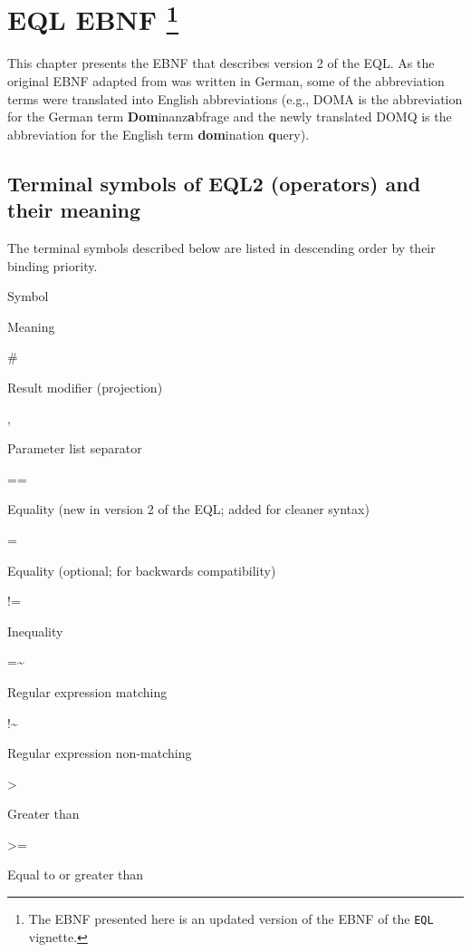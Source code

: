 \documentclass[]{book}
\let\rmarkdownfootnote\footnote%
\def\footnote{\protect\rmarkdownfootnote}
\begin{document}
\hypertarget{app-chap:EQL-EBNF}{%
\chapter[EQL EBNF ]{\texorpdfstring{EQL EBNF \footnote{The EBNF presented here is an updated version of the EBNF of the \texttt{EQL} vignette.}}{EQL EBNF }}\label{app-chap:EQL-EBNF}}

This chapter presents the EBNF \citep{garshol:2003a} that describes version 2 of the EQL. As the original EBNF adapted from \citet{john:2012a} was written in German, some of the abbreviation terms were translated into English abbreviations (e.g., DOMA is the abbreviation for the German term \textbf{Dom}inanz\textbf{a}bfrage and the newly translated DOMQ is the abbreviation for the English term \textbf{dom}ination \textbf{q}uery).

\hypertarget{terminal-symbols-of-eql2-operators-and-their-meaning}{%
\section{Terminal symbols of EQL2 (operators) and their meaning}\label{terminal-symbols-of-eql2-operators-and-their-meaning}}

The terminal symbols described below are listed in descending order by their binding priority.

Symbol

Meaning

\#

Result modifier (projection)

,

Parameter list separator

==

Equality (new in version 2 of the EQL; added for cleaner syntax)

=

Equality (optional; for backwards compatibility)

!=

Inequality

=\textasciitilde{}

Regular expression matching

!\textasciitilde{}

Regular expression non-matching

\textgreater{}

Greater than

\textgreater{}=

Equal to or greater than
\end{document}
